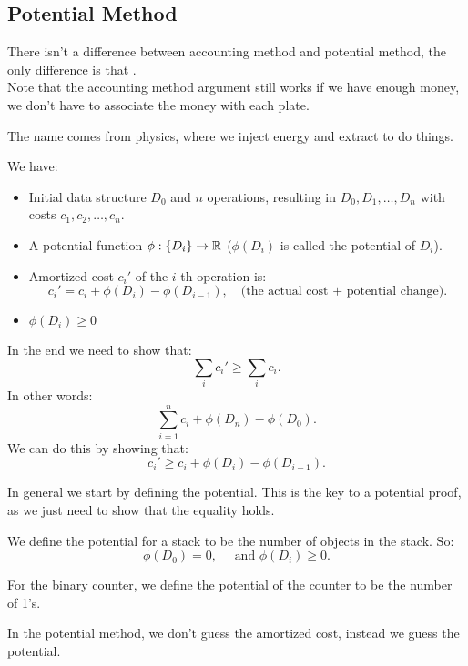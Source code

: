 \documentclass[../main/main.tex]{subfiles}
\begin{document}
\subsection{Potential Method}
There isn't a difference between accounting method and potential method, the only difference is that .\\

Note that the accounting method argument still works if we have enough money, we don't have to associate the money with each plate. 
\begin{remark}
	The name  comes from physics, where we inject energy and extract to do things.
\end{remark}
\begin{definition}
	We have:
	\begin{itemize}
		\item Initial data structure $D_0$ and $n$ operations, resulting in $D_0,D_1,\ldots,D_n$ with costs $c_1,c_2,\ldots,c_n$.
		\item A potential function $\phi: \{D_i\} \to \mathbb{R}$ ($\phi(D_i)$ is called the potential of $D_i$).
		\item Amortized cost $c_i'$ of the $i$-th operation is: \[
				c_i' = c_i + \phi(D_{i}) - \phi(D_{i-1}),\quad\text{(the actual cost + potential change)}
		.\] 
	\item $\phi(D_i)\ge 0$
	\end{itemize}
	In the end we need to show that: \[
		\sum_{i} c_i'\ge \sum_{i} c_i
	.\] In other words: \[
	\sum_{i=1}^nc_i + \phi(D_n)-\phi(D_0)
	.\] 
	We can do this by showing that: \[
		c_i' \ge c_i + \phi(D_i) - \phi(D_{i-1})
	.\] 
\end{definition}

In general we start by defining the potential. This is the key to a potential proof, as we just need to show that the equality holds.

\begin{example}
	We define the potential for a stack to be the number of objects in the stack. So: \[
		\phi(D_0)=0, \quad\text{ and  }\phi(D_i)\ge 0
	.\] 
\end{example}
\begin{example}
	For the binary counter, we define the potential of the counter to be the number of 1's.
\end{example}
\begin{remark}
	In the potential method, we don't guess the amortized cost, instead we guess the potential.
\end{remark}
\end{document}
